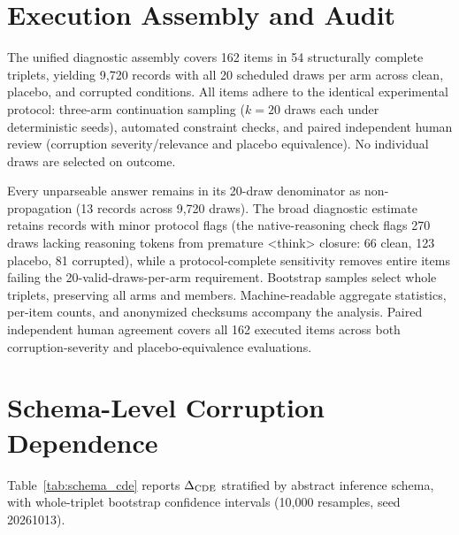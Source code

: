 \section{Execution Assembly and Audit}
\label{app:assembly}

The unified diagnostic assembly covers 162 items in 54 structurally complete triplets, yielding 9,720 records with all 20 scheduled draws per arm across clean, placebo, and corrupted conditions. All items adhere to the identical experimental protocol: three-arm continuation sampling ($k=20$ draws each under deterministic seeds), automated constraint checks, and paired independent human review (corruption severity/relevance and placebo equivalence). No individual draws are selected on outcome.

Every unparseable answer remains in its 20-draw denominator as non-propagation (13 records across 9,720 draws). The broad diagnostic estimate retains records with minor protocol flags (the native-reasoning check flags 270 draws lacking reasoning tokens from premature \textnormal{\textless{}think\textgreater{}} closure: 66 clean, 123 placebo, 81 corrupted), while a protocol-complete sensitivity removes entire items failing the 20-valid-draws-per-arm requirement. Bootstrap samples select whole triplets, preserving all arms and members. Machine-readable aggregate statistics, per-item counts, and anonymized checksums accompany the analysis. Paired independent human agreement covers all 162 executed items across both corruption-severity and placebo-equivalence evaluations.

\section{Schema-Level Corruption Dependence}
\label{app:schemas}

Table~\ref{tab:schema_cde} reports $\Delta_{\mathrm{CDE}}$ stratified by abstract inference schema, with whole-triplet bootstrap confidence intervals (10,000 resamples, seed 20261013).

